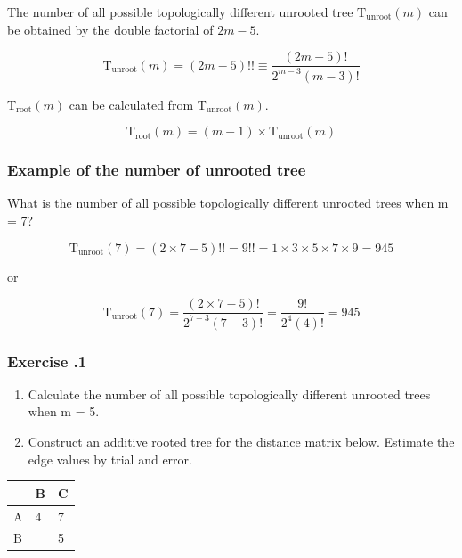 The number of all possible topologically different unrooted tree $\mathrm{T_{unroot}}(m)$ can be obtained by the double factorial of $2m-5$.

\[
\mathrm{T_{unroot}}(m) = (2m - 5)!! \equiv \dfrac{(2m-5)!}{2^{m-3}(m-3)!}
\]
\medskip

\noindent
$\mathrm{T_{root}}(m)$ can be calculated from $\mathrm{T_{unroot}}(m)$. 

\[
\mathrm{T_{root}}(m) = (m-1) \times \mathrm{T_{unroot}}(m)
\]

%
%
\subsubsection*{Example of the number of unrooted tree}
What is the number of all possible topologically different unrooted trees when m = 7?

\[
\mathrm{T_{unroot}}(7) = (2 \times 7 - 5)!! = 9!! =1 \times 3 \times 5 \times 7 \times9 = 945
\]

or

\[
\mathrm{T_{unroot}}(7) = \dfrac{(2 \times 7 - 5)!}{2^{7-3}(7-3)!} = \dfrac{9!}{2^{4}(4)!} = 945
\]

%
%
\subsubsection*{Exercise \thesection.1}
\begin{enumerate}
\item Calculate the number of all possible topologically different unrooted trees when m = 5.
\medskip 

\item Construct an additive rooted tree for the distance matrix below. Estimate the edge values by trial and error.
\end{enumerate}

\begin{table}[H]
\centering
\begin{tabular}{|l|l|l|}
\hline
  & B & C \\ \hline
A & 4 & 7 \\ \hline
B &   & 5 \\ \hline
\end{tabular}
\end{table}

\bigskip 

%
